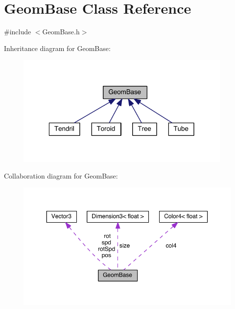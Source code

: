 \hypertarget{class_geom_base}{\section{Geom\-Base Class Reference}
\label{class_geom_base}
}


{\ttfamily \#include $<$Geom\-Base.\-h$>$}



Inheritance diagram for Geom\-Base\-:
\nopagebreak
\begin{figure}[H]
\begin{center}
\leavevmode
\includegraphics[width=301pt]{class_geom_base__inherit__graph}
\end{center}
\end{figure}


Collaboration diagram for Geom\-Base\-:
\nopagebreak
\begin{figure}[H]
\begin{center}
\leavevmode
\includegraphics[width=350pt]{class_geom_base__coll__graph}
\end{center}
\end{figure}
